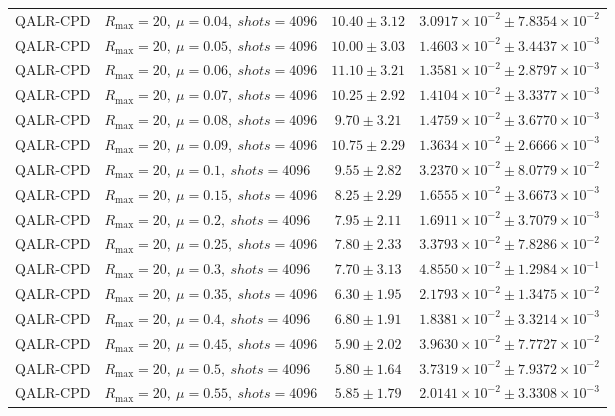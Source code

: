 \begin{table}[t]
\begin{tabular}{@{}llcc@{}}
QALR-CPD & \(R_{\max}=20,\ \mu=0.04,\ shots=4096\) & \(10.40 \pm 3.12\) & \(3.0917{\times}10^{-2} \pm 7.8354{\times}10^{-2}\) \\
QALR-CPD & \(R_{\max}=20,\ \mu=0.05,\ shots=4096\) & \(10.00 \pm 3.03\) & \(1.4603{\times}10^{-2} \pm 3.4437{\times}10^{-3}\) \\
QALR-CPD & \(R_{\max}=20,\ \mu=0.06,\ shots=4096\) & \(11.10 \pm 3.21\) & \(1.3581{\times}10^{-2} \pm 2.8797{\times}10^{-3}\) \\
QALR-CPD & \(R_{\max}=20,\ \mu=0.07,\ shots=4096\) & \(10.25 \pm 2.92\) & \(1.4104{\times}10^{-2} \pm 3.3377{\times}10^{-3}\) \\
QALR-CPD & \(R_{\max}=20,\ \mu=0.08,\ shots=4096\) & \(9.70 \pm 3.21\) & \(1.4759{\times}10^{-2} \pm 3.6770{\times}10^{-3}\) \\
QALR-CPD & \(R_{\max}=20,\ \mu=0.09,\ shots=4096\) & \(10.75 \pm 2.29\) & \(1.3634{\times}10^{-2} \pm 2.6666{\times}10^{-3}\) \\
QALR-CPD & \(R_{\max}=20,\ \mu=0.1,\ shots=4096\) & \(9.55 \pm 2.82\) & \(3.2370{\times}10^{-2} \pm 8.0779{\times}10^{-2}\) \\
QALR-CPD & \(R_{\max}=20,\ \mu=0.15,\ shots=4096\) & \(8.25 \pm 2.29\) & \(1.6555{\times}10^{-2} \pm 3.6673{\times}10^{-3}\) \\
QALR-CPD & \(R_{\max}=20,\ \mu=0.2,\ shots=4096\) & \(7.95 \pm 2.11\) & \(1.6911{\times}10^{-2} \pm 3.7079{\times}10^{-3}\) \\
QALR-CPD & \(R_{\max}=20,\ \mu=0.25,\ shots=4096\) & \(7.80 \pm 2.33\) & \(3.3793{\times}10^{-2} \pm 7.8286{\times}10^{-2}\) \\
QALR-CPD & \(R_{\max}=20,\ \mu=0.3,\ shots=4096\) & \(7.70 \pm 3.13\) & \(4.8550{\times}10^{-2} \pm 1.2984{\times}10^{-1}\) \\
QALR-CPD & \(R_{\max}=20,\ \mu=0.35,\ shots=4096\) & \(6.30 \pm 1.95\) & \(2.1793{\times}10^{-2} \pm 1.3475{\times}10^{-2}\) \\
QALR-CPD & \(R_{\max}=20,\ \mu=0.4,\ shots=4096\) & \(6.80 \pm 1.91\) & \(1.8381{\times}10^{-2} \pm 3.3214{\times}10^{-3}\) \\
QALR-CPD & \(R_{\max}=20,\ \mu=0.45,\ shots=4096\) & \(5.90 \pm 2.02\) & \(3.9630{\times}10^{-2} \pm 7.7727{\times}10^{-2}\) \\
QALR-CPD & \(R_{\max}=20,\ \mu=0.5,\ shots=4096\) & \(5.80 \pm 1.64\) & \(3.7319{\times}10^{-2} \pm 7.9372{\times}10^{-2}\) \\
QALR-CPD & \(R_{\max}=20,\ \mu=0.55,\ shots=4096\) & \(5.85 \pm 1.79\) & \(2.0141{\times}10^{-2} \pm 3.3308{\times}10^{-3}\) \\

\end{tabular}
\end{table}
